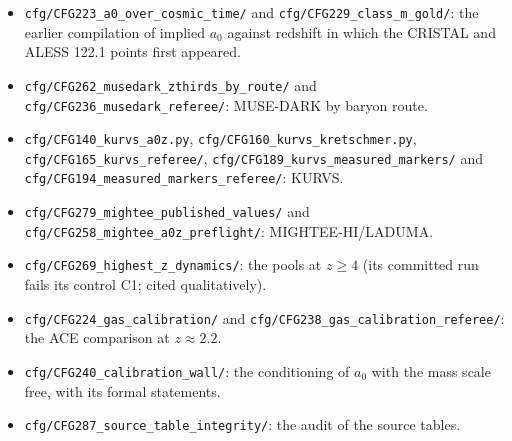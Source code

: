 \documentclass[fleqn,usenatbib]{mnras}
\begin{document}
\begin{itemize}
\item \nolinkurl{cfg/CFG223_a0_over_cosmic_time/} and \nolinkurl{cfg/CFG229_class_m_gold/}: the earlier compilation of implied $a_0$ against redshift in which the CRISTAL and ALESS 122.1 points first appeared.
\item \nolinkurl{cfg/CFG262_musedark_zthirds_by_route/} and \nolinkurl{cfg/CFG236_musedark_referee/}: MUSE-DARK by baryon route.
\item \nolinkurl{cfg/CFG140_kurvs_a0z.py}, \nolinkurl{cfg/CFG160_kurvs_kretschmer.py}, \nolinkurl{cfg/CFG165_kurvs_referee/}, \nolinkurl{cfg/CFG189_kurvs_measured_markers/} and \nolinkurl{cfg/CFG194_measured_markers_referee/}: KURVS.
\item \nolinkurl{cfg/CFG279_mightee_published_values/} and \nolinkurl{cfg/CFG258_mightee_a0z_preflight/}: MIGHTEE-HI/LADUMA.
\item \nolinkurl{cfg/CFG269_highest_z_dynamics/}: the pools at $z\geq4$ (its committed run fails its control C1; cited qualitatively).
\item \nolinkurl{cfg/CFG224_gas_calibration/} and \nolinkurl{cfg/CFG238_gas_calibration_referee/}: the ACE comparison at $z\approx2.2$.
\item \nolinkurl{cfg/CFG240_calibration_wall/}: the conditioning of $a_0$ with the mass scale free, with its formal statements.
\item \nolinkurl{cfg/CFG287_source_table_integrity/}: the audit of the source tables.
\end{itemize}

\bsp
\label{lastpage}
\end{document}

